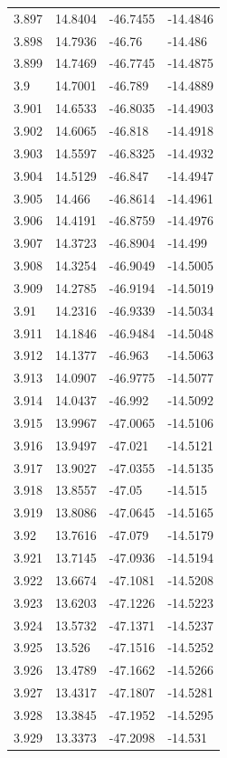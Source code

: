 \begin{tabular}{llll}
3.897 & 14.8404 & -46.7455 & -14.4846 \\
3.898 & 14.7936 & -46.76 & -14.486 \\
3.899 & 14.7469 & -46.7745 & -14.4875 \\
3.9 & 14.7001 & -46.789 & -14.4889 \\
3.901 & 14.6533 & -46.8035 & -14.4903 \\
3.902 & 14.6065 & -46.818 & -14.4918 \\
3.903 & 14.5597 & -46.8325 & -14.4932 \\
3.904 & 14.5129 & -46.847 & -14.4947 \\
3.905 & 14.466 & -46.8614 & -14.4961 \\
3.906 & 14.4191 & -46.8759 & -14.4976 \\
3.907 & 14.3723 & -46.8904 & -14.499 \\
3.908 & 14.3254 & -46.9049 & -14.5005 \\
3.909 & 14.2785 & -46.9194 & -14.5019 \\
3.91 & 14.2316 & -46.9339 & -14.5034 \\
3.911 & 14.1846 & -46.9484 & -14.5048 \\
3.912 & 14.1377 & -46.963 & -14.5063 \\
3.913 & 14.0907 & -46.9775 & -14.5077 \\
3.914 & 14.0437 & -46.992 & -14.5092 \\
3.915 & 13.9967 & -47.0065 & -14.5106 \\
3.916 & 13.9497 & -47.021 & -14.5121 \\
3.917 & 13.9027 & -47.0355 & -14.5135 \\
3.918 & 13.8557 & -47.05 & -14.515 \\
3.919 & 13.8086 & -47.0645 & -14.5165 \\
3.92 & 13.7616 & -47.079 & -14.5179 \\
3.921 & 13.7145 & -47.0936 & -14.5194 \\
3.922 & 13.6674 & -47.1081 & -14.5208 \\
3.923 & 13.6203 & -47.1226 & -14.5223 \\
3.924 & 13.5732 & -47.1371 & -14.5237 \\
3.925 & 13.526 & -47.1516 & -14.5252 \\
3.926 & 13.4789 & -47.1662 & -14.5266 \\
3.927 & 13.4317 & -47.1807 & -14.5281 \\
3.928 & 13.3845 & -47.1952 & -14.5295 \\
3.929 & 13.3373 & -47.2098 & -14.531 \\

\end{tabular}
